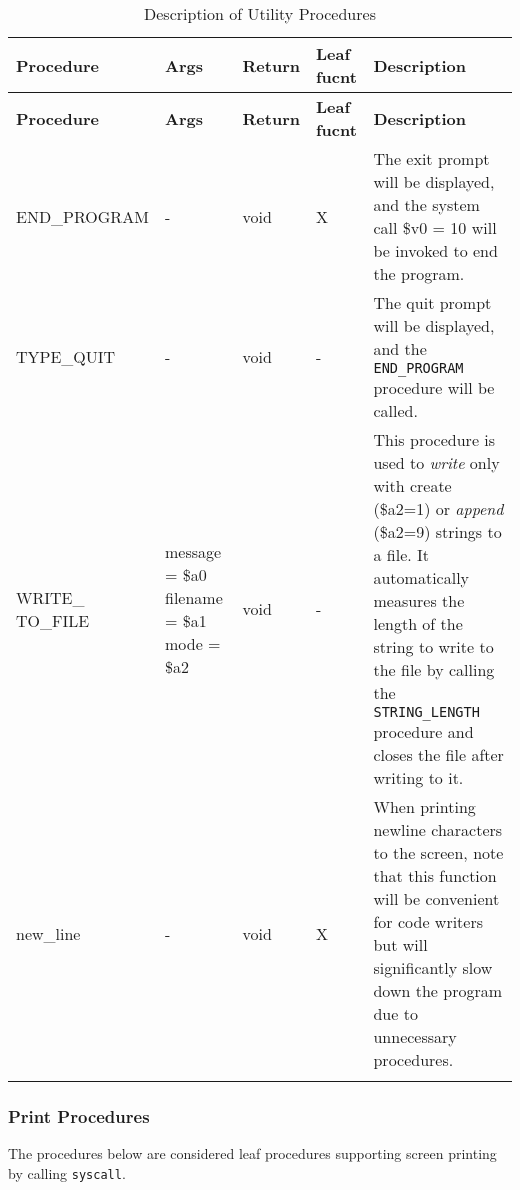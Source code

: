     \begin{longtable}{|m{3.3cm}|m{2.9cm}|m{1.3cm}|m{1.1cm}|m{5.6cm}|}
        \hline
            \textbf{Procedure} & 
            \textbf{Args} & 
            \textbf{Return} & 
            \centering \textbf{Leaf fucnt} &
            \textbf{Description}\\
        \hline
        \endfirsthead
        \hline
            \textbf{Procedure} & 
            \textbf{Args} & 
            \textbf{Return} & 
            \centering \textbf{Leaf fucnt} &
            \textbf{Description}\\
        \hline
        \endhead
            END\_PROGRAM& 
            \centering -&
            void&
            \centering X&
            The exit prompt will be displayed, and the system call \$v0 = 10 will be invoked to end the program.\\
        \hline
            TYPE\_QUIT& 
            \centering -&
            void&
            \centering -&
            The quit prompt will be displayed, and the \texttt{END\_PROGRAM} procedure will be called.\\
        \hline
            WRITE\_ TO\_FILE& 
            message = \$a0 \newline filename = \$a1 \newline mode = \$a2&
            void&
            \centering -&
            This procedure is used to \emph{write} only with create (\$a2=1) or \emph{append} (\$a2=9) strings to a file. It automatically measures the length of the string to write to the file by calling the \texttt{STRING\_LENGTH} procedure and closes the file after writing to it.\\
        \hline
            new\_line& 
            \centering -&
            void&
            \centering X&
            When printing newline characters to the screen, note that this function will be convenient for code writers but will significantly slow down the program due to unnecessary procedures.\\
        \hline
        \caption{Description of Utility Procedures} \\
    \end{longtable}

    \newpage
    
    \subsubsection{Print Procedures}
        \label{sec:3.Print}
        The procedures below are considered leaf procedures supporting screen printing by calling \texttt{syscall}.
        
